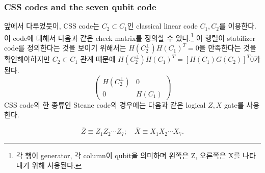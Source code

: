 \subsubsection{CSS codes and the seven qubit code}
앞에서 다루었듯이, CSS code는 $C_2 \subset C_1$인 classical linear code $C_1, C_2$를 이용한다. 이 code에 대해서 다음과 같은 check matrix를 정의할 수 있다.\footnote{각 행이 generator, 각 column이 qubit을 의미하며 왼쪽은 Z, 오른쪽은 X를 나타내기 위해 사용된다.}
이 행렬이 stabilizer code를 정의한다는 것을 보이기 위해서는 $H(C_2^\perp)H(C_1)^T = 0$을 만족한다는 것을 확인해야하지만 $C_2 \subset C_1$ 관계 떄문에 $H(C_2^\perp)H(C_1)^T = [H(C_1)G(C_2)]^T 0$가 된다.
\begin{equation*}
    \left(\begin{array}{cc}
        H\left(C_2^{\perp}\right) & 0 \\
        0 & H\left(C_1\right)
    \end{array}\right)
\end{equation*}
CSS code의 한 종류인 Steane code의 경우에는 다음과 같은 logical $Z, X$ gate를 사용한다. 

\begin{equation*}
    \bar{Z} \equiv Z_1 Z_2 \cdots Z_7 ; \quad \bar{X} \equiv X_1 X_2 \cdots X_7 .
\end{equation*}

